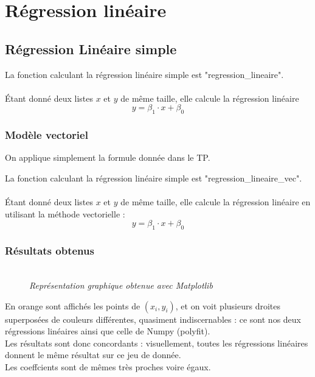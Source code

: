 \documentclass{article}      %
\begin{document}
\section{Régression linéaire}
\subsection{Régression Linéaire simple}
La fonction calculant la régression linéaire simple est "regression\_lineaire".
\\%
\\Étant donné deux listes $x$ et $y$ de même taille, elle calcule la régression linéaire $$y = \beta_1 \cdot x + \beta_0$$
%

\subsubsection{Modèle vectoriel}
On applique simplement la formule donnée dans le TP.

La fonction calculant la régression linéaire simple est "regression\_lineaire\_vec".
\\%
\\Étant donné deux listes $x$ et $y$ de même taille, elle calcule la régression linéaire en utilisant la méthode vectorielle : $$y = \beta_1 \cdot x + \beta_0$$
%


\subsubsection{Résultats obtenus}
\begin{figure}[H]
    \centering
    \\
    \textit{Représentation graphique obtenue avec Matplotlib}
\end{figure}
%
En orange sont affichés les points de $(x_i, y_i)$, et on voit plusieurs droites superposées de couleurs différentes, quasiment indiscernables : ce sont nos deux régressions linéaires ainsi que celle de Numpy (polyfit).
\\Les résultats sont donc concordants : visuellement, toutes les régressions linéaires donnent le même résultat sur ce jeu de donnée.
%
\\Les coeffcients sont de mêmes très proches voire égaux.
\end{document}
